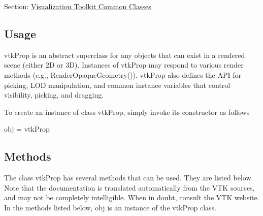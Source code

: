 Section\-: \hyperlink{sec_vtkcommon}{Visualization Toolkit Common Classes} \hypertarget{vtkwidgets_vtkxyplotwidget_Usage}{}\subsection{Usage}\label{vtkwidgets_vtkxyplotwidget_Usage}
vtk\-Prop is an abstract superclass for any objects that can exist in a rendered scene (either 2\-D or 3\-D). Instances of vtk\-Prop may respond to various render methods (e.\-g., Render\-Opaque\-Geometry()). vtk\-Prop also defines the A\-P\-I for picking, L\-O\-D manipulation, and common instance variables that control visibility, picking, and dragging.

To create an instance of class vtk\-Prop, simply invoke its constructor as follows \begin{DoxyVerb}  obj = vtkProp
\end{DoxyVerb}
 \hypertarget{vtkwidgets_vtkxyplotwidget_Methods}{}\subsection{Methods}\label{vtkwidgets_vtkxyplotwidget_Methods}
The class vtk\-Prop has several methods that can be used. They are listed below. Note that the documentation is translated automatically from the V\-T\-K sources, and may not be completely intelligible. When in doubt, consult the V\-T\-K website. In the methods listed below, {\ttfamily obj} is an instance of the vtk\-Prop class. 
